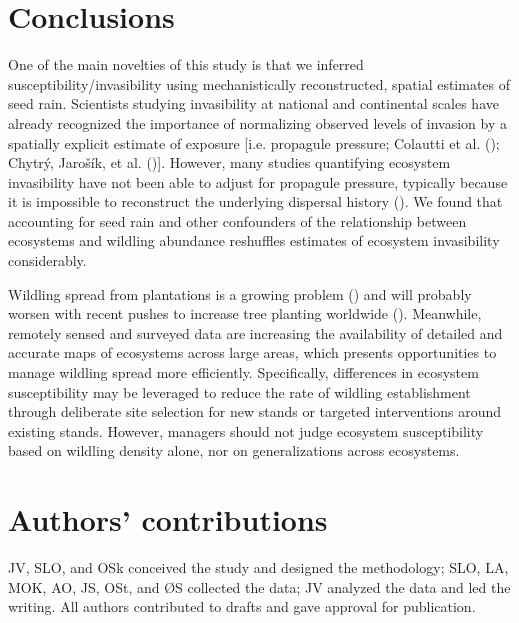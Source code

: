 \documentclass[
]{article}
\begin{document}
\section{Conclusions}\label{conclusions}

One of the main novelties of this study is that we inferred
susceptibility/invasibility using mechanistically reconstructed, spatial
estimates of seed rain. Scientists studying invasibility at national and
continental scales have already recognized the importance of normalizing
observed levels of invasion by a spatially explicit estimate of exposure {[}i.e.
propagule pressure; Colautti et al. ();
Chytrý, Jarošík, et al. (){]}. However, many studies quantifying
ecosystem invasibility have not been able to adjust for propagule pressure,
typically because it is impossible to reconstruct the underlying dispersal
history (). We found that accounting for
seed rain and other confounders of the relationship between ecosystems and
wildling abundance reshuffles estimates of ecosystem invasibility considerably.

Wildling spread from plantations is a growing problem
() and will probably worsen with recent
pushes to increase tree planting worldwide
(). Meanwhile, remotely sensed and
surveyed data are increasing the availability of detailed and accurate maps of
ecosystems across large areas, which presents opportunities to manage wildling
spread more efficiently. Specifically, differences in ecosystem susceptibility
may be leveraged to reduce the rate of wildling establishment through deliberate
site selection for new stands or targeted interventions around existing stands.
However, managers should not judge ecosystem susceptibility based on wildling
density alone, nor on generalizations across ecosystems.

\section{Authors' contributions}\label{authors-contributions}

JV, SLO, and OSk conceived the study and designed the methodology; SLO, LA, MOK,
AO, JS, OSt, and ØS collected the data; JV analyzed the data and led the
writing. All authors contributed to drafts and gave approval for publication.
\end{document}
